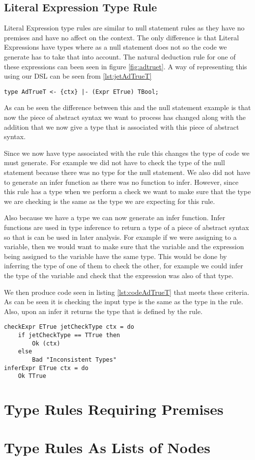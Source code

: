\subsection{Literal Expression Type Rule}
Literal Expression type rules are similar to null statement rules as they have no premises and have no affect on the context.
The only difference is that Literal Expressions have types where as a null statement does not so the code we generate has to take that into account.
The natural deduction rule for one of these expressions can been seen in figure \ref{fig:adtruet}.
A way of representing this using our DSL can be seen from \ref{lst:jetAdTrueT}
\begin{lstlisting}[caption = Jet type rule for true expression, label=lst:jetAdTrueT]
type AdTrueT <- {ctx} |- (Expr ETrue) TBool;
\end{lstlisting}

As can be seen the difference between this and the null statement example is that now the piece of abstract syntax we want to process has changed along with the addition that we now give a type that is associated with this piece of abstract syntax.

Since we now have type associated with the rule this changes the type of code we must generate.
For example we did not have to check the type of the null statement because there was no type for the null statement.
We also did not have to generate an infer function as there was no function to infer.
However, since this rule has a type when we perform a check we want to make sure that the type we are checking is the same as the type we are expecting for this rule.

Also because we have a type we can now generate an infer function.
Infer functions are used in type inference to return a type of a piece of abstract syntax so that is can be used in later analysis.
For example if we were assigning to a variable, then we would want to make sure that the variable and the expression being assigned to the variable have the same type.
This would be done by inferring the type of one of them to check the other, for example we could infer the type of the variable and check that the expression was also of that type.

We then produce code seen in listing \ref{lst:codeAdTrueT} that meets these criteria.
As can be seen it is checking the input type is the same as the type in the rule.
Also, upon an infer it returns the type that is defined by the rule.
\begin{lstlisting}[caption = Code Generated from rule AdTrueT, label=lst:codeAdTrueT]
checkExpr ETrue jetCheckType ctx = do
    if jetCheckType == TTrue then 
        Ok (ctx) 
    else 
        Bad "Inconsistent Types"
inferExpr ETrue ctx = do
    Ok TTrue
\end{lstlisting}

\section{Type Rules Requiring Premises}
\section{Type Rules As Lists of Nodes}
